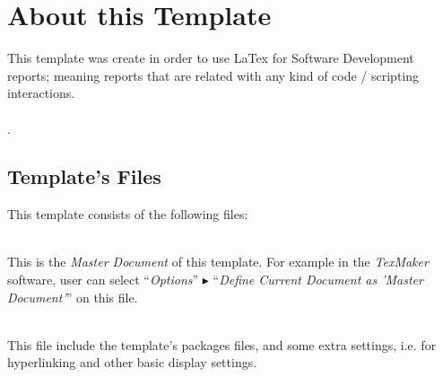 \chapter{About this Template}
This template was create in order to use LaTex for Software Development reports; meaning reports that are related with any kind of code / scripting interactions.
\\ \\ %
.

\section{Template's Files}
This template consists of the following files:
\begin{description}
\item{\textbf{}} \hfill \\
This is the \textit{Master Document} of this template. For example in the \textit{TexMaker} software, user can select ``\textit{Options}'' $\blacktriangleright$ ``\textit{Define Current Document as 'Master Document'}'' on this file.



\item{\textbf{}} \hfill \\
This file include the template's packages files, and some extra settings, i.e. for hyperlinking and other basic display settings.




\end{description}
